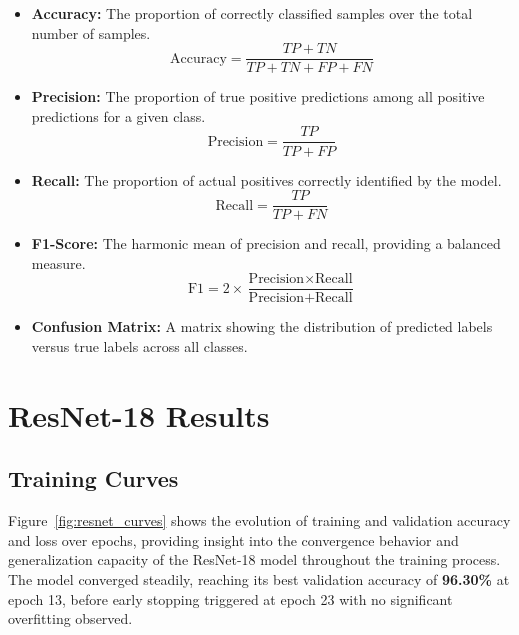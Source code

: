 \documentclass[12pt]{report}
\begin{document}
\begin{itemize}
    \item \textbf{Accuracy:} The proportion of correctly classified
    samples over the total number of samples.
    \begin{equation}
        \text{Accuracy} = \frac{TP + TN}{TP + TN + FP + FN}
    \end{equation}

    \item \textbf{Precision:} The proportion of true positive predictions
    among all positive predictions for a given class.
    \begin{equation}
        \text{Precision} = \frac{TP}{TP + FP}
    \end{equation}

    \item \textbf{Recall:} The proportion of actual positives correctly
    identified by the model.
    \begin{equation}
        \text{Recall} = \frac{TP}{TP + FN}
    \end{equation}

    \item \textbf{F1-Score:} The harmonic mean of precision and recall,
    providing a balanced measure.
    \begin{equation}
        \text{F1} = 2 \times \frac{\text{Precision} \times \text{Recall}}
        {\text{Precision} + \text{Recall}}
    \end{equation}

    \item \textbf{Confusion Matrix:} A matrix showing the distribution
    of predicted labels versus true labels across all classes.
\end{itemize}

\section{ResNet-18 Results}

\subsection{Training Curves}

Figure~\ref{fig:resnet_curves} shows the evolution of training and validation accuracy and loss over epochs, providing insight into the convergence behavior and generalization capacity of the ResNet-18 model throughout the training process. The model converged steadily,
reaching its best validation accuracy of \textbf{96.30\%} at epoch 13,
before early stopping triggered at epoch 23 with no significant
overfitting observed.
\end{document}
